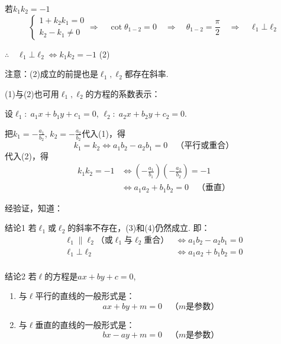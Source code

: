 若$k_1k_2=-1$
\[\begin{cases}
    1+k_2k_1=0\\
    k_2-k_1\ne 0
\end{cases}\Rightarrow\quad \cot\theta_{1-2}=0\quad \Rightarrow\quad    \theta_{1-2}=\frac{\pi}{2}\quad \Rightarrow\quad \ell_1\bot\ell_2\]

$\therefore\quad \ell_1\bot\ell_2 \Longleftrightarrow k_1k_2=-1$ \hfill(2)

注意：(2)成立的前提也是$\ell_1,\ell_2$都存在斜率.

(1)与(2)也可用$\ell_1,\ell_2$的方程的系数表示：

设$\ell_1:\; a_1x+b_1y+c_1=0$, $\ell_2:\; a_2x+b_2y+c_2=0$.

把$k_1=-\frac{a_1}{b_2}$, $k_2=-\frac{a_2}{b_2}$代入(1)，得
\begin{equation}
    k_1=k_2\Longleftrightarrow a_1b_2-a_2b_1=0\quad \text{（平行或重合）} \tag{3}
\end{equation}
代入(2)，得
\begin{align}
    k_1k_2=-1 &\Longleftrightarrow \left(-\frac{a_1}{b_1}\right)\left(-\frac{a_2}{b_2}\right)=-1 \nonumber\\
    &\Longleftrightarrow a_1a_2+b_1b_2=0 \quad \text{（垂直）} \tag{4}
\end{align} 

经验证，知道：
\begin{thm}{结论1}
    若$\ell_1$或$\ell_2$的斜率不存在，(3)和(4)仍然成立. 即：
\[\begin{split}
    \ell_1\parallel \ell_2 \text{（或$\ell_1$与$\ell_2$重合）} &\Longleftrightarrow a_1b_2-a_2b_1=0\\
    \ell_1\bot \ell_2  &\Longleftrightarrow a_1a_2+b_1b_2=0\\
\end{split}\]
\end{thm}


\begin{thm}{结论2}
    若$\ell$的方程是$ax+by+c=0$,
\begin{enumerate}[(1)]
\item 与$\ell$平行的直线的一般形式是：
\begin{equation}
    ax+by+m=0\quad \text{（$m$是参数）} \tag{5}
\end{equation}

\item 与$\ell$垂直的直线的一般形式是：
\begin{equation}
    bx-ay+m=0\quad \text{（$m$是参数）} \tag{6}
\end{equation}
\end{enumerate}
\end{thm}

